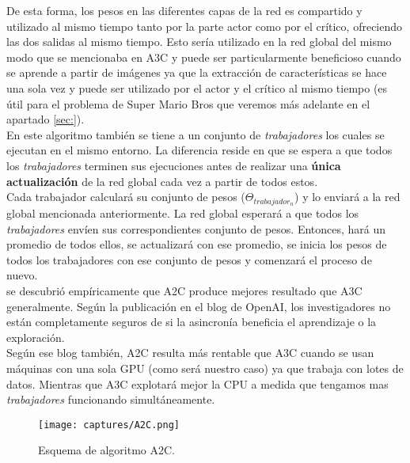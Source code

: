\documentclass[11pt,fleqn]{book} %
\begin{document}
De esta forma, los pesos en las diferentes capas de la red es compartido y utilizado al mismo tiempo tanto por la parte actor como por el crítico, ofreciendo las dos salidas al mismo tiempo. Esto sería utilizado en la red global del mismo modo que se mencionaba en A3C y puede ser particularmente beneficioso cuando se aprende a partir de imágenes ya que la extracción de características se hace una sola vez y puede ser utilizado por el actor y el crítico al mismo tiempo (es útil para el problema de Super Mario Bros que veremos más adelante en el apartado \ref{sec:}). \\

En este algoritmo también se tiene a un conjunto de \textit{trabajadores} los cuales se ejecutan en el mismo entorno. La diferencia reside en que se espera a que todos los \textit{trabajadores} terminen sus ejecuciones antes de realizar una \textbf{única actualización} de la red global cada vez a partir de todos estos. \\

Cada trabajador calculará su conjunto de pesos ($\Theta_{trabajador_n}$) y lo enviará a la red global mencionada anteriormente. La red global esperará a que todos los \textit{trabajadores} envíen sus correspondientes conjunto de pesos. Entonces, hará un promedio de todos ellos, se actualizará con ese promedio, se inicia los pesos de todos los trabajadores con ese conjunto de pesos y comenzará el proceso de nuevo. \\

se descubrió empíricamente que A2C produce mejores resultado que A3C generalmente. Según la publicación en el blog de OpenAI, los investigadores no están completamente seguros de si la asincronía beneficia el aprendizaje o la exploración. \\

Según ese blog también, A2C resulta más rentable que A3C cuando se usan máquinas con una sola GPU (como será nuestro caso) ya que trabaja con lotes de datos. Mientras que A3C explotará mejor la CPU a medida que tengamos mas \textit{trabajadores} funcionando simultáneamente. \\

\begin{figure}[H]
	\centering\texttt{[image: captures/A2C.png]}
	\caption{Esquema de algoritmo A2C.}
	\label{fig:A2C} %
\end{figure}
\end{document}
